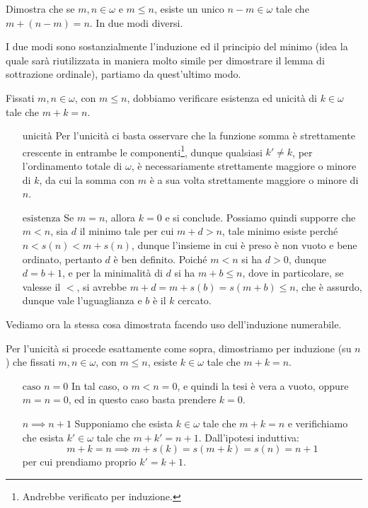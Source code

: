 \begin{exercise}
	Dimostra che se $m,n \in \omega$ e $m \leq n$, esiste un unico $n-m \in \omega$ tale che $m + (n-m) = n$. In due modi diversi.
\end{exercise}

I due modi sono sostanzialmente l'induzione ed il principio del minimo (idea la quale sarà riutilizzata in maniera molto simile per dimostrare il lemma di sottrazione ordinale), partiamo da quest'ultimo modo.

\begin{soln}
	Fissati $m,n \in \omega$, con $m \leq n$, dobbiamo verificare esistenza ed unicità di $k \in \omega$ tale che $m + k = n$.
	\begin{itemize}
		\item[$\boxed{\text{unicità}}$] Per l'unicità ci basta osservare che la funzione somma è strettamente crescente in entrambe le componenti\footnote{Andrebbe verificato per induzione.}, dunque qualsiasi $k' \ne k$, per l'ordinamento totale di $\omega$, è necessariamente strettamente maggiore o minore di $k$, da cui la somma con $m$ è a sua volta strettamente maggiore o minore di $n$.
		\item[$\boxed{\text{esistenza}}$] Se $m = n$, allora $k = 0$ e si conclude. Possiamo quindi supporre che $m < n$, sia $d$ il minimo tale per cui $m + d > n$, tale minimo esiste perché $n < s(n) < m + s(n)$, dunque l'insieme in cui è preso è non vuoto e bene ordinato, pertanto $d$ è ben definito. Poiché $m < n$ si ha $d > 0$, dunque $d = b + 1$, e per la minimalità
		di $d$ si ha $m + b \leq n$, dove in particolare, se valesse il $<$, si avrebbe $m + d = m + s(b) = s(m + b) \leq n$, che è assurdo, dunque vale l'uguaglianza e $b$ è il $k$ cercato.
	\end{itemize}
\end{soln}

Vediamo ora la stessa cosa dimostrata facendo uso dell'induzione numerabile.

\begin{soln}
	Per l'unicità si procede esattamente come sopra, dimostriamo per induzione (su $n$) che fissati $m,n \in \omega$, con $m \leq n$, esiste $k \in \omega$ tale che $m + k = n$.
	\begin{itemize}
		\item[$\boxed{\text{caso $n = 0$}}$] In tal caso, o $m < n = 0$, e quindi la tesi è vera a vuoto, oppure $m = n = 0$, ed in questo caso basta prendere $k = 0$.
		\item[$\boxed{n \implies n + 1}$] Supponiamo che esista $k \in \omega$ tale che $m + k = n$ e verifichiamo che esista $k' \in \omega$ tale che $m + k' = n + 1$. Dall'ipotesi induttiva:
		\[ m + k = n \implies m + s(k) = s(m + k) = s(n) = n + 1
			\]
		per cui prendiamo proprio $k ' = k + 1$.
	\end{itemize}
\end{soln}